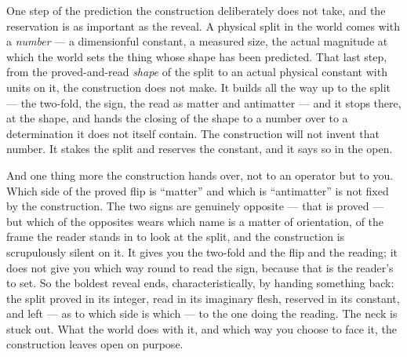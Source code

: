 One step of the prediction the construction deliberately does not take, and the reservation is as important as the
reveal. A physical split in the world comes with a \emph{number} --- a dimensionful constant, a measured size, the
actual magnitude at which the world sets the thing whose shape has been predicted. That last step, from the
proved-and-read \emph{shape} of the split to an actual physical constant with units on it, the construction does
not make. It builds all the way up to the split --- the two-fold, the sign, the read as matter and antimatter ---
and it stops there, at the shape, and hands the closing of the shape to a number over to a determination it does
not itself contain. The construction will not invent that number. It stakes the split and reserves the constant, and it
says so in the open.

And one thing more the construction hands over, not to an operator but to you. Which side of the proved flip is
``matter'' and which is ``antimatter'' is not fixed by the construction. The two signs are genuinely opposite ---
that is proved --- but which of the opposites wears which name is a matter of orientation, of the frame the reader
stands in to look at the split, and the construction is scrupulously silent on it. It gives you the two-fold and
the flip and the reading; it does not give you which way round to read the sign, because that is the reader's to
set. So the boldest reveal ends, characteristically, by handing something back: the split proved in its
integer, read in its imaginary flesh, reserved in its constant, and left --- as to which side is which --- to the
one doing the reading. The neck is stuck out. What the world does with it, and which way you choose to face it, the
construction leaves open on purpose.
